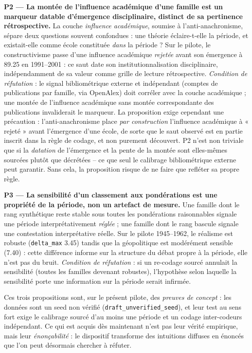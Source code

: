 \documentclass[11pt,a4paper]{article}
\begin{document}
\textbf{P2 --- La montée de l'influence académique d'une famille est un marqueur datable d'émergence disciplinaire, distinct de sa pertinence rétrospective.} La couche \emph{influence académique}, soumise à l'anti-anachronisme, sépare deux questions souvent confondues : une théorie éclaire-t-elle la période, et existait-elle comme école constituée \emph{dans} la période ? Sur le pilote, le constructivisme passe d'une influence académique \emph{rejetée} avant son émergence à 89.25 en 1991--2001 : ce saut date son institutionnalisation disciplinaire, indépendamment de sa valeur comme grille de lecture rétrospective. \emph{Condition de réfutation} : le signal bibliométrique externe et indépendant (comptes de publications par famille, via OpenAlex) doit corréler avec la couche académique ; une montée de l'influence académique sans montée correspondante des publications invaliderait le marqueur. La proposition exige cependant une précaution : l'anti-anachronisme place \emph{par construction} l'influence académique à « rejeté » avant l'émergence d'une école, de sorte que le saut observé est en partie inscrit dans la règle de codage, et non purement découvert. P2 n'est non triviale que si la \emph{datation} de l'émergence et la pente de la montée sont elles-mêmes sourcées plutôt que décrétées -- ce que seul le calibrage bibliométrique externe peut garantir. Sans cela, la proposition risque de ne faire que refléter sa propre règle.

\textbf{P3 --- La sensibilité d'un classement aux pondérations est une propriété de la période, non un artefact de mesure.} Une famille dont le rang synthétique reste stable sous toutes les pondérations raisonnables signale une période interprétativement \emph{réglée} ; une famille dont le rang bascule signale une contestation interprétative réelle. Sur le pilote 1945--1962, le réalisme est robuste (\texttt{delta\_max} 3.45) tandis que la géopolitique est modérément sensible (7.40) : cette différence informe sur la structure du débat propre à la période, elle n'est pas du bruit. \emph{Condition de réfutation} : si un re-codage sourcé annulait la sensibilité (toutes les familles devenant robustes), l'hypothèse selon laquelle la sensibilité porte une information sur la période serait infirmée.

Ces trois propositions sont, sur le présent pilote, des \emph{preuves de concept} : les données sont un seed non vérifié (\texttt{draft\_unverified\_seed}), et leur test au sens fort exige le calibrage sourcé d'au moins une période et un codage inter-codeurs indépendant. Ce qui est acquis dès maintenant n'est pas leur vérité empirique, mais leur \emph{énonçabilité} : le dispositif transforme des intuitions diffuses en énoncés que l'on peut désormais chercher à réfuter.
\end{document}
